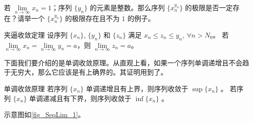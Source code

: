 \begin{exercise}{}
  若 $\lim\limits_{n\rightarrow \infty} x_n=1$；序列 $\{y_n\}$ 的元素是整数。那么序列 $\{x_n^{y_n}\}$  的极限是否一定存在？请举一个 $\{x_n^{y_n}\}$ 的极限存在且不为 $1$ 的例子。
\end{exercise}

\begin{theorem}{夹逼收敛定理}
  设序列 $\{x_n\}$, $\{y_n\}$ 和 $\{z_n\}$ 满足 $x_n\leq z_n\leq y_n,\ \forall n>N_0$。
若 $\lim\limits_{n\rightarrow \infty}x_n=\lim\limits_{n\rightarrow \infty}y_n=a$，则 $\lim\limits_{n\rightarrow \infty}z_n=a$。
\end{theorem}
下面我们要介绍的是单调收敛原理。从直观上看，如果一个序列单调递增且不会趋于无穷大，那么它应该是有上确界的。其证明用到了。

\begin{theorem}{单调收敛原理}
若序列 $\{x_n\}$ 单调递增且有上界，则序列收敛于 $\sup \{x_n\}$ 。
若序列 $\{x_n\}$ 单调递减且有下界，则序列收敛于 $\inf\{x_n\}$ 。
\end{theorem}
示意图如\autoref{fig_SeqLim_1}。
